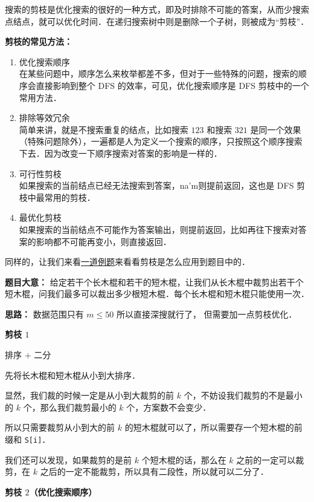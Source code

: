 搜索的剪枝是优化搜索的很好的一种方式，即及时排除不可能的答案，从而少搜索点结点，就可以优化时间．在递归搜索树中则是删除一个子树，则被成为“剪枝”．

\textbf{剪枝的常见方法：}

\begin{enumerate}
\item 优化搜索顺序\\
在某些问题中，顺序怎么来枚举都差不多，但对于一些特殊的问题，搜索的顺序会直接影响到整个 DFS 的效率，可见，优化搜索顺序是 DFS 剪枝中的一个常用方法．

\item 排除等效冗余 \\
简单来讲，就是不搜索重复的结点，比如搜索 $123$ 和搜索 $321$ 是同一个效果（特殊问题除外），一遍都是人为定义一个搜索的顺序，只按照这个顺序搜索下去．因为改变一下顺序搜索对答案的影响是一样的．

\item 可行性剪枝\\
如果搜索的当前结点已经无法搜索到答案，na'm则提前返回，这也是 DFS 剪枝中最常用的剪枝．

\item 最优化剪枝 \\
如果搜索的当前结点不可能作为答案输出，则提前返回，比如再往下搜索对答案的影响都不可能再变小，则直接返回．
\end{enumerate}

同样的，让我们来看\href{https://loj.ac/p/2148}{一道例题}来看看剪枝是怎么应用到题目中的．

\textbf{题目大意：}
给定若干个长木棍和若干的短木棍，让我们从长木棍中裁剪出若干个短木棍，问我们最多可以裁出多少根短木棍．每个长木棍和短木棍只能使用一次．

\textbf{思路：}
数据范围只有 $m\leq50$ 所以直接深搜就行了， 但需要加一点剪枝优化．


\textbf{剪枝 $1$}

排序 $+$ 二分 

先将长木棍和短木棍从小到大排序．

显然，我们裁的时候一定是从小到大裁剪的前 $k$ 个，不妨设我们裁剪的不是最小的 $k$ 个，那么我们裁剪最小的 $k$ 个，方案数不会变少．

所以只需要裁剪从小到大的前 $k$ 的短木棍就可以了，所以需要存一个短木棍的前缀和 \verb|S[i]|．

我们还可以发现，如果裁剪的是前 $k$ 个短木棍的话，那么在 $k$ 之前的一定可以裁剪，在 $k$ 之后的一定不能裁剪，所以具有二段性，所以就可以二分了．	

\textbf{剪枝 $2$（优化搜索顺序）}

